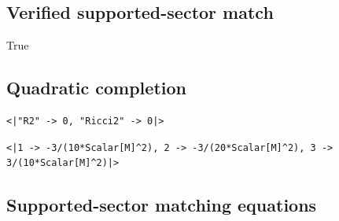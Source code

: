 \documentclass[11pt]{article}
\begin{document}
\subsection{Verified supported-sector match}
True
\subsection{Quadratic completion}
\begin{verbatim}
<|"R2" -> 0, "Ricci2" -> 0|>
\end{verbatim}
\begin{verbatim}
<|1 -> -3/(10*Scalar[M]^2), 2 -> -3/(20*Scalar[M]^2), 3 -> 3/(10*Scalar[M]^2)|>
\end{verbatim}
\subsection{Supported-sector matching equations}
\end{document}
